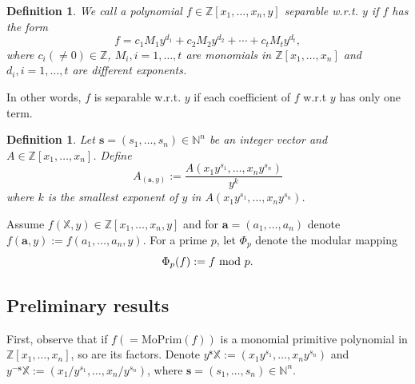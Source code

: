 \documentclass[final,20pt]{elsarticle}
\newtheorem{definition}[theorem]{Definition}
\def\N{{\mathbb N}}
\def\Z{{\mathbb Z}}
\def\X{{\mathbb{X}}}
\begin{document}
\begin{definition}\label{def-1}
We call a polynomial $f\in \Z[x_1,\dots,x_n,y]$ {\em separable} w.r.t. $y$ if $f$ has the form
$$f=c_1M_1y^{d_1}+c_2M_2y^{d_2}+\cdots+c_tM_ty^{d_t},$$
where $c_i(\neq 0)\in \Z$, $M_i,i=1,\dots,t$ are monomials in $\Z[x_1,\dots,x_n]$ and $d_i,i=1,\dots,t$ are different exponents.
\end{definition}
%
In other words, $f$ is separable w.r.t. $y$ if each coefficient of $f$ w.r.t $y$ has only one term.
%
\begin{definition}
Let $\mathbf{s}=(s_1,\dots,s_n)\in\N^n$ be an integer vector and $A\in\Z[x_1,\dots,x_n]$.
%
Define
\begin{equation}\label{eq-1}
A_{(\mathbf{s},y)}:=\frac{A(x_1y^{s_1},\dots,x_ny^{s_n})}{y^k}
\end{equation}
where $k$ is the smallest exponent of $y$ in $A(x_1y^{s_1},\dots,x_ny^{s_n})$.
\end{definition}

Assume $f(\X,y)\in\Z[x_1,\dots,x_n,y]$ and for $\mathbf{a}=(a_1,\dots,a_n)$ denote $f(\mathbf{a},y):=f(a_1,\dots,a_n,y)$. For a prime $p$, let $\Phi_p$ denote the modular mapping
\begin{equation}\label{eq-2}
\Phi_p(f):=f~{\rm mod}~p.
\end{equation}


\subsection{Preliminary results}
First, observe that
if $f(=\mathrm{MoPrim}(f))$ is a monomial primitive polynomial in $\Z[x_1,\dots,x_n]$, so are its factors.
%
Denote $y^\mathbf{s}\X:=(x_1y^{s_1},\dots,x_ny^{s_n})$ and $y^{-\mathbf{s}}\X:=(x_1/y^{s_1},\dots,x_n/y^{s_n})$, where $\mathbf{s}=(s_1,\dots,s_n)\in \N^n$.
\end{document}
